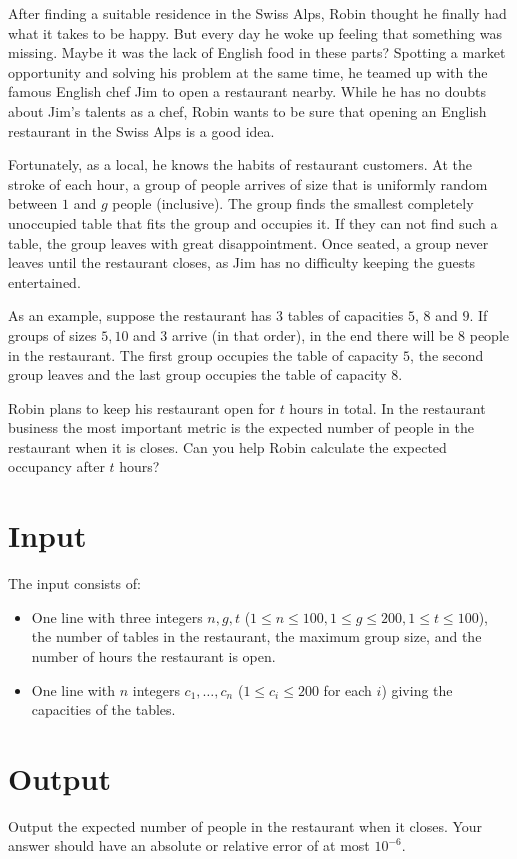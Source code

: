 
After finding a suitable residence in the Swiss Alps, Robin thought he finally had what it takes to be
happy. But every day he woke up feeling that something was missing. Maybe it was the lack of English
food in these parts? Spotting a market opportunity and solving his problem at the same time, he
teamed up with the famous English chef Jim to open a restaurant nearby. While he has no doubts about
Jim's talents as a chef, Robin wants to be sure that opening an English restaurant in the Swiss Alps
is a good idea.

Fortunately, as a local, he knows the habits of restaurant customers. At the stroke of each hour, a
group of people arrives of size that is uniformly random between $1$ and $g$ people (inclusive).
The group finds the smallest completely unoccupied table that fits the group and occupies it. If
they can not find such a table, the group leaves with great disappointment. Once seated, a group
never leaves until the restaurant closes, as Jim has no difficulty keeping the guests entertained.

As an example, suppose the restaurant has $3$ tables of capacities $5$, $8$ and $9$. If groups of
sizes $5, 10$ and $3$ arrive (in that order), in the end there will be $8$ people in the restaurant.
The first group occupies the table of capacity $5$, the second group leaves and the last group
occupies the table of capacity $8$.

Robin plans to keep his restaurant open for $t$ hours in total. In the restaurant business the most
important metric is the expected number of people in the restaurant when it is closes. Can
you help Robin calculate the expected occupancy after $t$ hours?


\section*{Input}

The input consists of:
\begin{itemize}
\item One line with three integers $n, g, t$ ($1 \le n \le 100, 1\leq g\leq 200, 1\leq t \leq 100$), the
  number of tables in the restaurant, the maximum group size, and the number of hours the restaurant
  is open.
\item One line with $n$ integers $c_1, \ldots, c_n$ ($1 \le c_i \le 200$ for each $i$) giving the
  capacities of the tables.
\end{itemize}


\section*{Output}

Output the expected number of people in the restaurant when it closes.
Your answer should have an absolute or relative error of at most $10^{-6}$.
